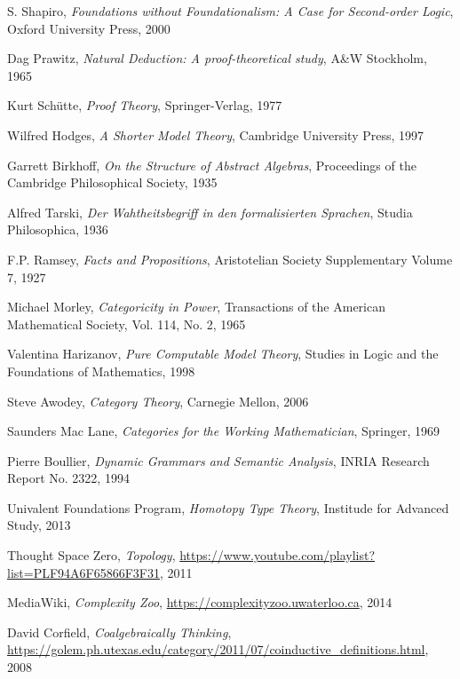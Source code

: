 \documentclass{article}
\begin{document}
\begin{thebibliography}{99}
    S. Shapiro,
    \emph{Foundations without Foundationalism: A Case for Second-order Logic},
    Oxford University Press,
    2000

    Dag Prawitz,
    \emph{Natural Deduction: A proof-theoretical study},
    A\&W Stockholm,
    1965

    Kurt Sch\"utte,
    \emph{Proof Theory},
    Springer-Verlag,
    1977

    Wilfred Hodges,
    \emph{A Shorter Model Theory},
    Cambridge University Press,
    1997

    Garrett Birkhoff,
    \emph{On the Structure of Abstract Algebras},
    Proceedings of the Cambridge Philosophical Society,
    1935

    Alfred Tarski,
    \emph{Der Wahtheitsbegriff in den formalisierten Sprachen},
    Studia Philosophica,
    1936

    F.P. Ramsey,
    \emph{Facts and Propositions},
    Aristotelian Society Supplementary Volume 7,
    1927

    Michael Morley,
    \emph{Categoricity in Power},
    Transactions of the American Mathematical Society, Vol. 114, No. 2,
    1965

    Valentina Harizanov,
    \emph{Pure Computable Model Theory},
    Studies in Logic and the Foundations of Mathematics,
    1998

    Steve Awodey,
    \emph{Category Theory},
    Carnegie Mellon,
    2006

    Saunders Mac Lane,
    \emph{Categories for the Working Mathematician},
    Springer,
    1969

    Pierre Boullier,
    \emph{Dynamic Grammars and Semantic Analysis},
    INRIA Research Report No. 2322,
    1994

    Univalent Foundations Program,
    \emph{Homotopy Type Theory},
    Institude for Advanced Study,
    2013

    Thought Space Zero,
    \emph{Topology},
    \url{https://www.youtube.com/playlist?list=PLF94A6F65866F3F31},
    2011

    MediaWiki,
    \emph{Complexity Zoo},
    \url{https://complexityzoo.uwaterloo.ca},
    2014

    David Corfield,
    \emph{Coalgebraically Thinking},
    \url{https://golem.ph.utexas.edu/category/2011/07/coinductive_definitions.html},
    2008


\end{thebibliography}
\end{document}
